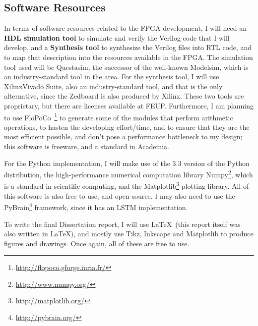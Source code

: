 \subsection{Software Resources}
In terms of software resources related to the FPGA development, I will need an \textbf{HDL simulation tool} to simulate and verify the Verilog code that I will develop, and a \textbf{Synthesis tool} to synthesize the Verilog files into RTL code, and to map that description into the resources available in the FPGA. The simulation tool used will be Questasim\texttrademark, the successor of the well-known Modelsim\texttrademark, which is an industry-standard tool in the area. For the synthesis tool, I will use Xilinx\textregistered Vivado Suite, also an industry-standard tool, and that is the only alternative, since the Zedboard is also produced by Xilinx\textregistered. These two tools are proprietary, but there are licenses available at FEUP. Furthermore, I am planning to use FloPoCo~\footnote{\href{http://flopoco.gforge.inria.fr/}{http://flopoco.gforge.inria.fr/}} to generate some of the modules that perform arithmetic operations, to hasten the developing effort/time, and to ensure that they are the most efficient possible, and don't pose a performance bottleneck to my design; this software is freeware, and a standard in Academia.

For the Python implementation, I will make use of the 3.3 version of the Python distribution, the high-performance numerical computation library Numpy\footnote{\href{http://www.numpy.org/}{http://www.numpy.org/}}, which is a standard in scientific computing, and the Matplotlib\footnote{\href{http://matplotlib.org/}{http://matplotlib.org/}} plotting library. All of this software is also free to use, and open-source. I may also need to use the PyBrain\footnote{\href{http://pybrain.org/}{http://pybrain.org/}} framework, since it has an LSTM implementation. 

To write the final Dissertation report, I will use \LaTeX~(this report itself was also written in \LaTeX), and mostly use Tikz, Inkscape and Matplotlib to produce figures and drawings. Once again, all of these are free to use.
